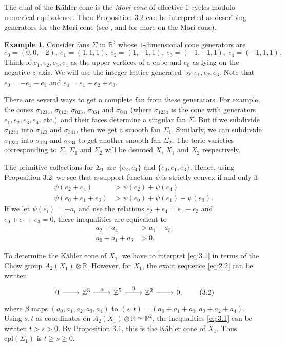 \documentclass{amsart}
\theoremstyle{plain}
\theoremstyle{definition}
\newtheorem*{example}{Example}
\begin{document}
	The dual of the K\"ahler cone is the {\it Mori cone\/} of
effective $1$-cycles modulo numerical equivalence.  Then Proposition
3.2 can be interpreted as describing generators for the Mori cone (see
\cite{Bat2}, \cite{OP} and \cite{Rei2} for more on the Mori cone).

\begin{example} Consider fans $\Sigma$ in $\mathbb{R}^3$ whose
$1$-dimensional cone generators are
\[
e_0 = (0,0,-2),\ e_1 = (1,1,1),\ e_2 = (1,-1,1),\ e_3 = (-1,-1,1),\ e_4 =
(-1,1,1).
\]
Think of $e_1,e_2,e_3,e_4$ as the upper vertices of a cube and $e_0$
as lying on the negative $z$-axis.  We will use the integer lattice
generated by $e_1,e_2,e_3$.  Note that $e_0 = -e_1-e_3$ and $e_4 = e_1
- e_2 + e_3$.

	There are several ways to get a complete fan from these
generators.  For example, the cones $\sigma_{1234}$, $\sigma_{012}$,
$\sigma_{023}$, $\sigma_{034}$ and $\sigma_{041}$ (where
$\sigma_{1234}$ is the cone with generators $e_1,e_2,e_3,e_4$,
etc.)~and their faces determine a singular fan $\Sigma$.  But if we
subdivide $\sigma_{1234}$ into $\sigma_{123}$ and $\sigma_{341}$, then
we get a smooth fan $\Sigma_1$.  Similarly, we can subdivide
$\sigma_{1234}$ into $\sigma_{124}$ and $\sigma_{234}$ to get another
smooth fan $\Sigma_2$.  The toric varieties corresponding to $\Sigma$,
$\Sigma_1$ and $\Sigma_2$ will be denoted $X$, $X_1$ and $X_2$
respectively.

	The primitive collections for $\Sigma_1$ are $\{e_2,e_4\}$ and
$\{e_0,e_1,e_3\}$.  Hence, using Proposition 3.2, we see that a
support function $\psi$ is strictly convex if and only if
\begin{align*}
\psi(e_2+e_4) &> \psi(e_2) + \psi(e_4) \\
\psi(e_0+e_1+e_3) &> \psi(e_0) + \psi(e_1) + \psi(e_3).
\end{align*}
If we let $\psi(e_i) = -a_i$ and use the relations $e_2+e_4 = e_1+e_3$
and $e_0+e_1+e_3 = 0$, these inequalities are equivalent to
\begin{equation}
\begin{aligned}
a_2 + a_4  &> a_1 + a_3\\
a_0 + a_1 + a_3&> 0.
\end{aligned}
\tag{3.1}\label{eq:3.1}
\end{equation}

	To determine the K\"ahler cone of $X_1$, we have to interpret
\eqref{eq:3.1} in terms of the Chow group $A_2(X_1)\otimes\mathbb{R}$.
However, for $X_1$, the exact sequence \eqref{eq:2.2} can be written
\begin{equation}
\begin{tikzcd}
0 \arrow[r] & \mathbb{Z}^3 \arrow[r, "\alpha"] & \mathbb{Z}^5 \arrow[r, "\beta"] & \mathbb{Z}^2 \arrow[r] & 0,
\end{tikzcd}
\tag{3.2}\label{eq:3.2}
\end{equation}
where $\beta$ maps $(a_0,a_1,a_2,a_3,a_4)$ to $(s,t) =
(a_0+a_1+a_3,a_0+a_2+a_4)$.  Using $s,t$ as coordinates on
$A_2(X_1)\otimes\mathbb{R} \simeq \mathbb{R}^2$, the inequalities
\eqref{eq:3.1} can be written $t > s > 0$.  By Proposition 3.1, this is
the K\"ahler cone of $X_1$.  Thus $\mathrm{cpl}(\Sigma_1)$ is
$t \ge s \ge 0$.


\end{example}
\end{document}
